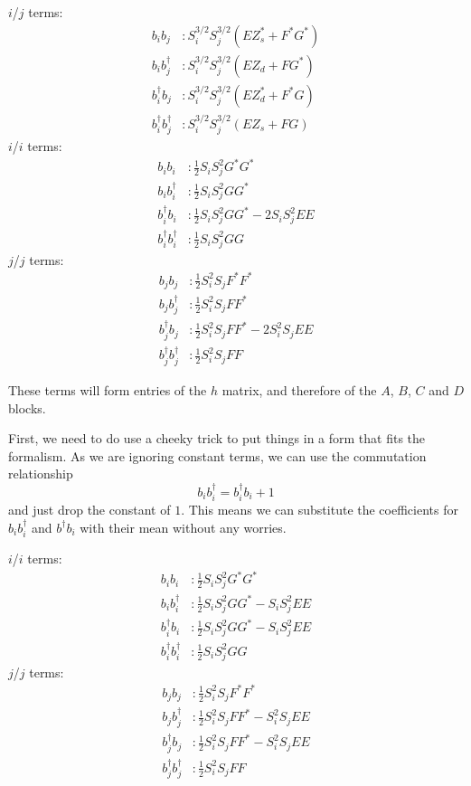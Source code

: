 \documentclass{article}
\begin{document}
$i$/$j$ terms:
\begin{align}
b_i b_j                 &: S_i^{3/2} S_j^{3/2} \left( EZ_s^* + F^*G^* \right)  \\
b_i b_j^\dagger         &: S_i^{3/2} S_j^{3/2} \left( EZ_d   + FG^*   \right)  \\
b_i^\dagger b_j         &: S_i^{3/2} S_j^{3/2} \left( EZ_d^* + F^*G   \right)  \\
b_i^\dagger b_j^\dagger &: S_i^{3/2} S_j^{3/2} \left( EZ_s   + FG     \right)
\end{align}
$i$/$i$ terms:
\begin{align}
b_i b_i                 &: \frac{1}{2} S_i S_j^2 G^* G^* \\
b_i b_i^\dagger         &: \frac{1}{2} S_i S_j^2 G G^*  \\
b_i^\dagger b_i         &: \frac{1}{2} S_i S_j^2 G G^* - 2 S_i S_j^2 E E  \\
b_i^\dagger b_i^\dagger &: \frac{1}{2} S_i S_j^2 G G
\end{align}
$j$/$j$ terms:
\begin{align}
b_j b_j                 &: \frac{1}{2} S_i^2 S_j F^* F^* \\
b_j b_j^\dagger         &: \frac{1}{2} S_i^2 S_j F F^*  \\
b_j^\dagger b_j         &: \frac{1}{2} S_i^2 S_j F F^* - 2 S_i^2 S_j E E   \\
b_j^\dagger b_j^\dagger &: \frac{1}{2} S_i^2 S_j F F
\end{align}

These terms will form entries of the $h$ matrix, and therefore of the $A$, $B$, $C$ and $D$ blocks.

First, we need to do use a cheeky trick to put things in a form that fits the formalism.
As we are ignoring constant terms, we can use the commutation relationship
\[b_i b_i^\dagger = b_i^\dagger b_i + 1\]
and just drop the constant of $1$. This means we can substitute the coefficients
for $b_i b_i^\dagger$ and $b^\dagger b_i$ with their mean without any worries.

$i$/$i$ terms:
\begin{align}
b_i b_i                 &: \frac{1}{2} S_i S_j^2 G^* G^* \\
b_i b_i^\dagger         &: \frac{1}{2} S_i S_j^2 G G^* - S_i S_j^2 E E \\
b_i^\dagger b_i         &: \frac{1}{2} S_i S_j^2 G G^* - S_i S_j^2 E E  \\
b_i^\dagger b_i^\dagger &: \frac{1}{2} S_i S_j^2 G G
\end{align}
$j$/$j$ terms:
\begin{align}
b_j b_j                 &: \frac{1}{2} S_i^2 S_j F^* F^* \\
b_j b_j^\dagger         &: \frac{1}{2} S_i^2 S_j F F^* - S_i^2 S_j E E  \\
b_j^\dagger b_j         &: \frac{1}{2} S_i^2 S_j F F^* - S_i^2 S_j E E   \\
b_j^\dagger b_j^\dagger &: \frac{1}{2} S_i^2 S_j F F
\end{align}
\end{document}
